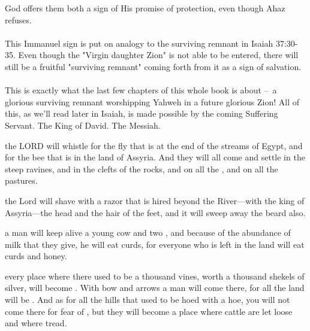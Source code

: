 \documentclass[11pt]{article}
\begin{document}
God offers them both a sign of His promise of protection, even though Ahaz refuses.
\\\\
This Immanuel sign is put on analogy to the surviving remnant in Isaiah 37:30-35. Even though the "Virgin daughter Zion" is not able to be entered, there will still be a fruitful "surviving remnant" coming forth from it as a sign of salvation.
\\\\
This is exactly what the last few chapters of this whole book is about – a glorious surviving remnant worshipping Yahweh in a future glorious Zion! All of this, as we'll read later in Isaiah, is made possible by the coming Suffering Servant. The King of David. The Messiah.


\begin{biblicaloutline}[Isaiah 7:18-25]

    \begin{versesection}{2em}
          the LORD will whistle for the fly that is at the end of the streams of Egypt, and for the bee that is in the land of Assyria.  And they will all come and settle in the steep ravines, and in the clefts of the rocks, and on all the , and on all the pastures.
        
          the Lord will shave with a razor that is hired beyond the River—with the king of Assyria—the head and the hair of the feet, and it will sweep away the beard also.

          a man will keep alive a young cow and two ,  and because of the abundance of milk that they give, he will eat curds, for everyone who is left in the land will eat curds and honey.
        
          every place where there used to be a thousand vines, worth a thousand shekels of silver, will become .  With bow and arrows a man will come there, for all the land will be .  And as for all the hills that used to be hoed with a hoe, you will not come there for fear of , but they will become a place where cattle are let loose and where  tread.
    \end{versesection}

\end{biblicaloutline}
\end{document}
